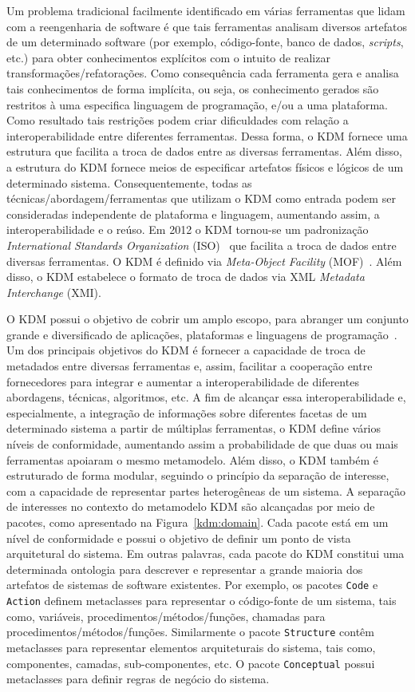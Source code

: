 \documentclass[12pt]{article}
\begin{document}
Um problema tradicional facilmente identificado em várias ferramentas que lidam com a reengenharia de software é que tais ferramentas analisam diversos artefatos de um determinado software (por exemplo, código-fonte, banco de dados, \textit{scripts}, etc.) para obter conhecimentos explícitos com o intuito de realizar transformações/refatorações. Como consequência cada ferramenta gera e analisa tais conhecimentos de forma implícita, ou seja, os conhecimento gerados são restritos à uma especifica linguagem de programação, e/ou a uma plataforma. Como resultado tais restrições podem criar dificuldades com relação a interoperabilidade entre diferentes ferramentas. Dessa forma, o KDM fornece uma estrutura que facilita a troca de dados entre as diversas ferramentas. Além disso, a estrutura do KDM fornece meios de especificar artefatos físicos e lógicos de um determinado sistema. Consequentemente, todas as técnicas/abordagem/ferramentas que utilizam o KDM como entrada podem ser consideradas independente de plataforma e linguagem, aumentando assim, a interoperabilidade e o reúso. Em 2012 o KDM tornou-se um padronização \textit{International Standards Organization} (ISO)~\cite{KDM:specification} que facilita a troca de dados entre diversas ferramentas. O KDM é definido via \textit{Meta-Object Facility} (MOF)~\cite{MOF}. Além disso, o KDM estabelece o formato de troca de dados via XML \textit{Metadata Interchange} (XMI).

O KDM possui o objetivo de cobrir um amplo escopo, para abranger um conjunto grande e diversificado de aplicações, plataformas e linguagens de programação~\cite{KDM:specification, PerezCastillo:2011jo}. Um dos principais objetivos do KDM é fornecer a capacidade de troca de metadados entre diversas ferramentas e, assim, facilitar a cooperação entre fornecedores para integrar e aumentar a interoperabilidade de diferentes abordagens, técnicas, algoritmos, etc. A fim de alcançar essa interoperabilidade e, especialmente, a integração de informações sobre diferentes facetas de um determinado sistema a partir de múltiplas ferramentas, o KDM define vários níveis de conformidade, aumentando assim a probabilidade de que duas ou mais ferramentas apoiaram o mesmo metamodelo. Além disso, o KDM também é estruturado de forma modular, seguindo o princípio da separação de interesse, com a capacidade de representar partes heterogêneas de um sistema. A separação de interesses no contexto do metamodelo KDM são alcançadas por meio de pacotes, como apresentado na Figura~\ref{kdm:domain}. Cada pacote está em um nível de conformidade e possui o objetivo de definir um ponto de vista arquitetural do sistema. Em outras palavras, cada pacote do KDM constitui uma determinada ontologia para descrever e representar a grande maioria dos artefatos de sistemas de software existentes. Por exemplo, os pacotes \texttt{Code} e \texttt{Action} definem metaclasses para representar o código-fonte de um sistema, tais como, variáveis, procedimentos/métodos/funções, chamadas para procedimentos/métodos/funções. Similarmente o pacote \texttt{Structure} contêm metaclasses para representar elementos arquiteturais do sistema, tais como, componentes, camadas, sub-componentes, etc. O pacote \texttt{Conceptual} possui  metaclasses para definir regras de negócio do sistema.
\end{document}
